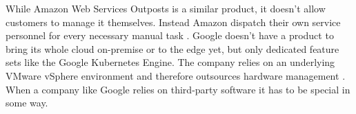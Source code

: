 \newline
While Amazon Web Services Outposts is a similar product, it doesn't allow customers to manage it themselves. Instead Amazon dispatch their own service personnel for every necessary manual task \cite{aws_outposts} \cite{aws_outposts_faq}.
\newline
Google doesn't have a product to bring its whole cloud on-premise or to the edge yet, but only dedicated feature sets like the Google Kubernetes Engine. The company relies on an underlying VMware vSphere environment and therefore outsources hardware management \cite{google_anthos_onprem}.
\newline
When a company like Google relies on third-party software it has to be special in some way.


